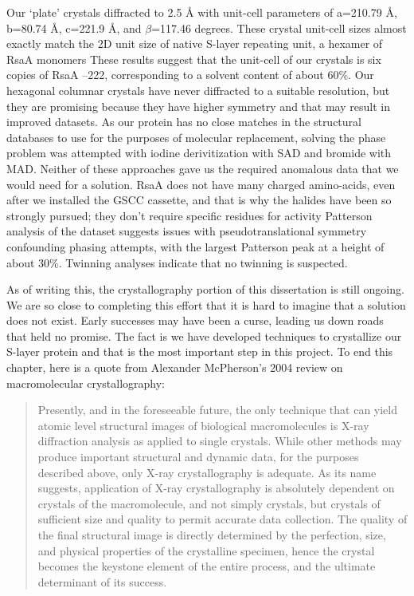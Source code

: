 Our `plate' crystals diffracted to 2.5 \AA{} with unit-cell parameters of
a=210.79 \AA, b=80.74 \AA, c=221.9 \AA,  and $\beta$=117.46 degrees. These
crystal unit-cell sizes almost exactly match the 2D unit size of native
\ac{S-layer} repeating unit, a hexamer of RsaA monomers
These results suggest that the unit-cell of our crystals is six copies of RsaA
--222, corresponding to a solvent content of  about 60\%. Our hexagonal
columnar crystals have never diffracted to a suitable resolution, but they are
promising because they have higher symmetry and that may result in improved
datasets. As our protein has no close matches in the structural databases to use
for the purposes of molecular replacement, solving the phase problem was
attempted with iodine derivitization with \ac{SAD} and bromide with \ac{MAD}.
Neither of these approaches gave us the required anomalous data that we would
need for a solution.   RsaA does not have many charged amino-acids, even after
we installed the GSCC cassette, and that is why the halides have been so
strongly pursued; they don't require specific residues for
activity Patterson analysis of the dataset suggests issues with
pseudotranslational symmetry confounding phasing attempts, with the largest
Patterson peak at a height of about 30\%.  Twinning analyses indicate that no twinning is suspected.

As of writing this, the crystallography portion of this dissertation is still ongoing. We are so close to completing this effort that it is hard to imagine that a solution does not exist. Early successes may have been a curse, leading us down roads that held no promise. The fact is we have developed techniques to crystallize our \ac{S-layer} protein and that is the most important step in this project. To end this chapter, here is a quote from Alexander McPherson's 2004 review on macromolecular crystallography:

\begin{quote}
 Presently, and in the foreseeable future, the only technique that can yield atomic level structural images of biological macromolecules is X-ray diffraction analysis as applied to single crystals. While other methods may produce important structural and dynamic data, for the purposes described above, only X-ray crystallography is adequate. As its name suggests, application of X-ray crystallography is absolutely dependent on crystals of the macromolecule, and not simply crystals, but crystals of sufficient size and quality to permit accurate data collection. The quality of the final structural image is directly determined by the perfection, size, and physical properties of the crystalline specimen, hence the crystal becomes the keystone element of the entire process, and the ultimate determinant of its success.
\end{quote}